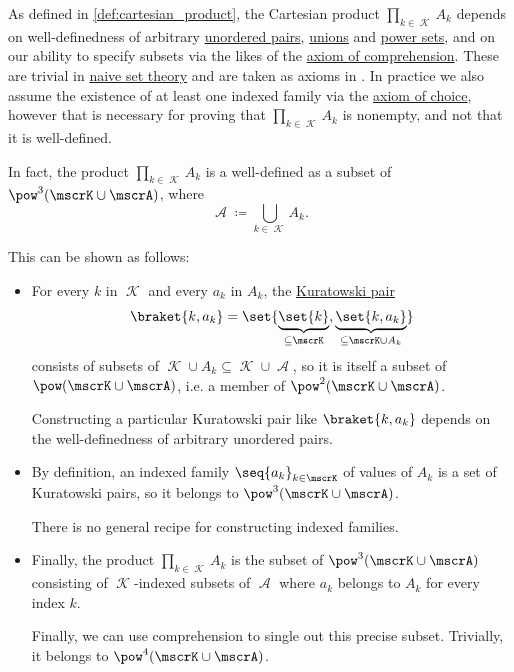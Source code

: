 \begin{remark}\label{rem:cartesian_product_existence}
  As defined in \cref{def:cartesian_product}, the Cartesian product \( \prod_{k \in \mscrK} A_k \) depends on well-definedness of arbitrary \hyperref[def:unordered_pair]{unordered pairs}, \hyperref[def:set_union]{unions} and \hyperref[def:power_set]{power sets}, and on our ability to specify subsets via the likes of the \hyperref[def:zfc/comprehension]{axiom of comprehension}. These are trivial in \hyperref[def:naive_set_theory]{naive set theory} and are taken as axioms in \hyperref[def:zfc]{}. In practice we also assume the existence of at least one indexed family via the \hyperref[def:zfc/choice]{axiom of choice}, however that is necessary for proving that \( \prod_{k \in \mscrK} A_k \) is nonempty, and not that it is well-defined.

  In fact, the product \( \prod_{k \in \mscrK} A_k \) is a well-defined as a subset of \( \pow^3(\mscrK \cup \mscrA) \), where
  \begin{equation*}
    \mscrA \coloneqq \bigcup_{k \in \mscrK} A_k.
  \end{equation*}

  This can be shown as follows:
  \begin{itemize}
    \item For every \( k \) in \( \mscrK \) and every \( a_k \) in \( A_k \), the \hyperref[def:kuratowski_pair]{Kuratowski pair}
    \begin{equation*}
      \braket{ k, a_k } = \set{ \underbrace{\set{ k }}_{\subseteq \mscrK}, \underbrace{\set{ k, a_k }}_{\subseteq \mscrK \cup A_k} }
    \end{equation*}
    consists of subsets of \( \mscrK \cup A_k \subseteq \mscrK \cup \mscrA \), so it is itself a subset of \( \pow(\mscrK \cup \mscrA) \), i.e. a member of \( \pow^2(\mscrK \cup \mscrA) \).

    Constructing a particular Kuratowski pair like \( \braket{ k, a_k } \) depends on the well-definedness of arbitrary unordered pairs.

    \item By definition, an indexed family \( \seq{ a_k }_{k \in \mscrK} \) of values of \( A_k \) is a set of Kuratowski pairs, so it belongs to \( \pow^3(\mscrK \cup \mscrA) \).

    There is no general recipe for constructing indexed families.

    \item Finally, the product \( \prod_{k \in \mscrK} A_k \) is the subset of \( \pow^3(\mscrK \cup \mscrA) \) consisting of \( \mscrK \)-indexed subsets of \( \mscrA \) where \( a_k \) belongs to \( A_k \) for every index \( k \).

    Finally, we can use comprehension to single out this precise subset. Trivially, it belongs to \( {\pow^4(\mscrK \cup \mscrA)} \).
  \end{itemize}
\end{remark}
